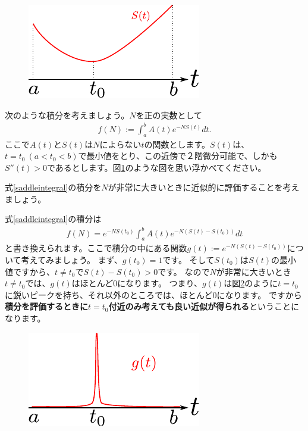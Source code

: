 \documentclass[report,paper=a4, fontsize=12pt, line_length=16cm, number_of_lines=33,dvipdfmx]{jlreq}
\numberwithin{equation}{section}
\newcommand{\strong}[1]{\textsf{\bfseries #1}}
\begin{document}
\begin{figure}[htbp]
  \centering
  \includegraphics{saddlefunction.pdf}
  \caption{}
  \label{fig:saddlefunction}
\end{figure}
次のような積分を考えましょう。$N$を正の実数として
\begin{align}
  f(N):=\int_{a}^{b}A(t)e^{-N S(t)}dt.\label{saddleintegral}
\end{align}
ここで$A(t)$と$S(t)$は$N$によらない$t$の関数とします。$S(t)$は、$t=t_0\ (a<t_0<b)$で最小値をとり、この近傍で２階微分可能で、しかも$S''(t)>0$であるとします。図\ref{fig:saddlefunction}のような図を思い浮かべてください。

式\eqref{saddleintegral}の積分を$N$が非常に大きいときに近似的に評価することを考えましょう。

式\eqref{saddleintegral}の積分は
\begin{align}
  f(N)=e^{-NS(t_0)}\int_{a}^{b}A(t)e^{-N (S(t)-S(t_0))}dt\label{saddleintegral2}
\end{align}
と書き換えられます。ここで積分の中にある関数$g(t):=e^{-N (S(t)-S(t_0))}$について考えてみましょう。
まず、$g(t_0)=1$です。
そして$S(t_0)$は$S(t)$の最小値ですから、$t\ne t_0$で$S(t)-S(t_0)>0$です。
なので$N$が非常に大きいとき$t\ne t_0$では、$g(t)$はほとんど$0$になります。
つまり、$g(t)$は図\ref{fig:saddlefunction2}のように$t=t_0$に鋭いピークを持ち、それ以外のところでは、ほとんど$0$になります。
ですから\strong{積分を評価するときに$t=t_0$付近のみ考えても良い近似が得られる}ということになります。
\begin{figure}[htbp]
  \centering
  \includegraphics{saddlefunction2.pdf}
  \caption{}
  \label{fig:saddlefunction2}
\end{figure}
\end{document}
